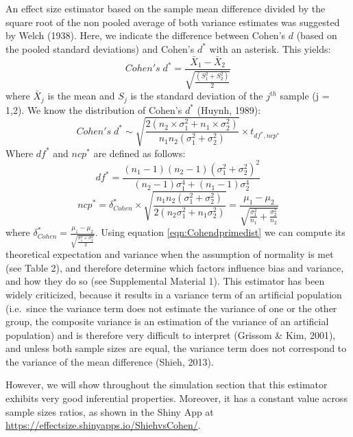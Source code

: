 \documentclass[
  12pt,
  french,
]{article}
\begin{document}
An effect size estimator based on the sample mean difference divided by
the square root of the non pooled average of both variance estimates was
suggested by Welch (1938). Here, we indicate the difference between
Cohen's \(d\) (based on the pooled standard deviations) and Cohen's
\(d^*\) with an asterisk. This yields: \begin{equation*} 
Cohen's \; d^* = \frac{\bar{X}_{1} - \bar{X}_{2}}{ \sqrt{\frac{\left(S^2_{1}+S^2_{2} \right)}{2}}}
\label{eqn:Cohenprimeds}
\end{equation*} where \(\bar{X}_{j}\) is the mean and \(S_j\) is the
standard deviation of the \(j^{th}\) sample (j = 1,2). We know the
distribution of Cohen's \(d^*\) (Huynh, 1989): \begin{equation} 
Cohen's \; d^* \sim  \sqrt{\frac{2(n_2\times\sigma^2_1+n_1\times\sigma^2_2)}{n_1n_2(\sigma^2_1+\sigma^2_2)}} \times t_{df^*,ncp^*}
\label{eqn:Cohendprimedist}
\end{equation} Where \(df^*\) and \(ncp^*\) are defined as follows:
\begin{equation} 
df^* = \frac{(n_1-1)(n_2-1)(\sigma^2_1+\sigma^2_2)^2}{(n_2-1)\sigma^4_1+(n_1-1)\sigma^4_2}
\label{eqn:Cohendprimedf}
\end{equation} \begin{equation*} 
ncp^*=\delta^*_{Cohen} \times \sqrt{\frac{n_1n_2(\sigma^2_1+\sigma^2_2)}{2(n_2\sigma^2_1+n_1\sigma^2_2)}}=\frac{\mu_1-\mu_2}{\sqrt{\frac{\sigma_1^2}{n_1}+\frac{\sigma^2_2}{n_2}}}
\label{eqn:Cohendprimevst}
\end{equation*} where
\(\delta^*_{Cohen}=\frac{\mu_1-\mu_2}{\sqrt{\frac{\sigma^2_1+\sigma^2_2}{2}}}\).
Using equation \ref{eqn:Cohendprimedist} we can compute its theoretical
expectation and variance when the assumption of normality is met (see
Table 2), and therefore determine which factors influence bias and
variance, and how they do so (see Supplemental Material 1). This
estimator has been widely criticized, because it results in a variance
term of an artificial population (i.e.~since the variance term does not
estimate the variance of one or the other group, the composite variance
is an estimation of the variance of an artificial population) and is
therefore very difficult to interpret (Grissom \& Kim, 2001), and unless
both sample sizes are equal, the variance term does not correspond to
the variance of the mean difference (Shieh, 2013).

However, we will show throughout the simulation section that this
estimator exhibits very good inferential properties. Moreover, it has a
constant value across sample sizes ratios, as shown in the Shiny App at
\url{https://effectsize.shinyapps.io/ShiehvsCohen/}.
\end{document}
